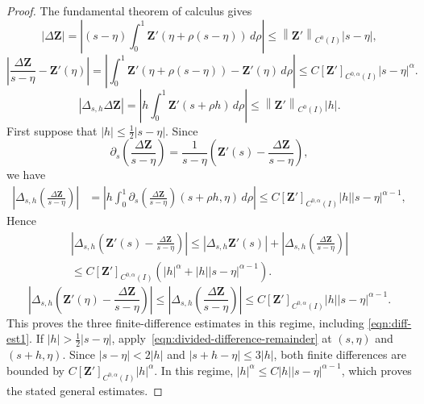 \documentclass[11pt,reqno]{amsart}
\theoremstyle{plain}
\theoremstyle{definition}
\numberwithin{equation}{section}
\newcommand{\paren}[1]{\left(#1\right)}
\newcommand{\p}{\partial}
\newcommand{\bm}[1]{\boldsymbol{#1}}
\newcommand{\abs}[1]{\left\lvert #1 \right\rvert}
\newcommand{\norm}[1]{\left\lVert #1 \right\rVert}
\newcommand{\ci}[1]{C^{#1}(I)}
\begin{document}
\begin{proof}
The fundamental theorem of calculus gives
\begin{equation}
    \abs{\Delta\bm Z} = \abs{\paren{s-\eta} \int_0^1 \bm Z'(\eta + \rho(s-\eta))\,d\rho  } \le \norm{\bm Z'}_{\ci{0}} \abs{s-\eta},
\end{equation}
\begin{equation}
    \abs{\frac{\Delta \bm Z}{s-\eta} - \bm Z'(\eta)} = \abs{ \int_0^1 \bm Z'\paren{\eta + \rho(s-\eta)} - \bm Z'(\eta)\,d\rho } \le C [\bm Z']_{\ci{0,\alpha}} \abs{s-\eta}^\alpha .
\end{equation}
\begin{equation}
    \abs{\Delta_{s,h} \Delta \bm Z} = \abs{ h \int_0^1 \bm Z'(s+\rho h) \,d\rho } \le \norm{\bm Z'}_{\ci{0}} \abs{h}.
\end{equation}
First suppose that $\abs h\le\frac12\abs{s-\eta}$. Since
\begin{equation}
    \p_s\paren{\frac{\Delta\bm Z}{s-\eta}} = \frac{1}{s-\eta}\paren{\bm Z'(s) - \frac{\Delta\bm Z}{s-\eta}},
\end{equation}
we have
\begin{equation}
\begin{aligned}
    \abs{\Delta_{s,h}\paren{\frac{\Delta\bm Z}{s-\eta}}} &= \abs{h \int_0^1\p_s\paren{\frac{\Delta\bm Z}{s-\eta}} (s+\rho h, \eta) \,d\rho } \le C[\bm Z']_{\ci{0,\alpha}}\abs{h}\abs{s-\eta}^{\alpha-1} ,
\end{aligned}
\end{equation}
Hence
\begin{equation}
\begin{aligned}
    \abs{\Delta_{s,h} \paren{\bm Z'(s) - \frac{\Delta\bm Z}{s-\eta}} } \le \abs{\Delta_{s,h}\bm Z'(s)} + \abs{\Delta_{s,h}\paren{\frac{\Delta\bm Z}{s-\eta}}} \\
    \le C [\bm Z']_{\ci{0,\alpha}}\paren{\abs{h}^\alpha+\abs{h} \abs{s-\eta}^{\alpha-1}}.
\end{aligned}
\end{equation}
\begin{equation}
    \abs{\Delta_{s,h} \paren{\bm Z'(\eta) - \frac{\Delta\bm Z}{s-\eta}} } \le\abs{\Delta_{s,h}\paren{\frac{\Delta\bm Z}{s-\eta}}} \le C [\bm Z']_{\ci{0,\alpha}}\abs{h} \abs{s-\eta}^{\alpha-1}.
\end{equation}
This proves the three finite-difference estimates in this regime, including
\eqref{eqn:diff-est1}. If
$\abs h>\frac12\abs{s-\eta}$, apply~\eqref{eqn:divided-difference-remainder}
at $(s,\eta)$ and $(s+h,\eta)$. Since
$\abs{s-\eta}<2\abs h$ and
$\abs{s+h-\eta}\le3\abs h$, both finite differences are bounded by
$C[\bm Z']_{\ci{0,\alpha}}\abs h^\alpha$. In this regime,
$\abs h^\alpha\le C\abs h\abs{s-\eta}^{\alpha-1}$, which proves the
stated general estimates.
\end{proof}
\end{document}
